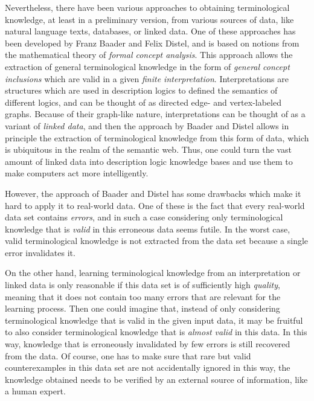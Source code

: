 Nevertheless, there have been various approaches to obtaining terminological knowledge, at
least in a preliminary version, from various sources of data, like natural language texts,
databases, or linked data.  One of these approaches has been developed by Franz Baader and
Felix Distel, and is based on notions from the mathematical theory of \emph{formal concept
  analysis}.  This approach allows the extraction of general terminological knowledge in
the form of \emph{general concept inclusions} which are valid in a given \emph{finite
  interpretation}.  Interpretations are structures which are used in description logics to
defined the semantics of different logics, and can be thought of as directed edge- and
vertex-labeled graphs.  Because of their graph-like nature, interpretations can be thought
of as a variant of \emph{linked data}, and then the approach by Baader and Distel allows
in principle the extraction of terminological knowledge from this form of data, which is
ubiquitous in the realm of the semantic web.  Thus, one could turn the vast amount of
linked data into description logic knowledge bases and use them to make computers act more
intelligently.

However, the approach of Baader and Distel has some drawbacks which make it hard to apply
it to real-world data.  One of these is the fact that every real-world data set contains
\emph{errors}, and in such a case considering only terminological knowledge that is
\emph{valid} in this erroneous data seems futile.  In the worst case, valid terminological
knowledge is not extracted from the data set because a single error invalidates it.

On the other hand, learning terminological knowledge from an interpretation or linked data
is only reasonable if this data set is of sufficiently high \emph{quality}, meaning that
it does not contain too many errors that are relevant for the learning process.  Then one
could imagine that, instead of only considering terminological knowledge that is valid in
the given input data, it may be fruitful to also consider terminological knowledge that is
\emph{almost valid} in this data.  In this way, knowledge that is erroneously invalidated
by few errors is still recovered from the data.  Of course, one has to make sure that rare
but valid counterexamples in this data set are not accidentally ignored in this way, \ie
the knowledge obtained needs to be verified by an external source of information, like a
human expert.

